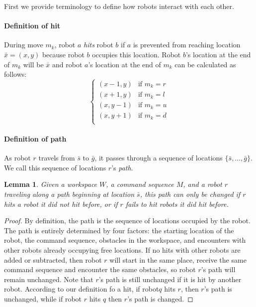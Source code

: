 \documentclass[letterpaper, 10 pt, conference]{ieeeconf}
\newtheorem{lemma}[theorem]{Lemma}
\begin{document}
First we provide terminology to define how robots interact with each other. 


\paragraph{Definition of hit}
During move $m_k$, robot $a$ \emph{hits} robot $b$ if $a$ is prevented from reaching location $\bar{x}=(x,y)$ because robot $b$ occupies this location. Robot $b$'s location at the end of $m_k$ will be $\bar{x}$ and robot $a$'s location at the end of $m_k$ can be calculated as follows:
\begin{displaymath}
    \left\{
     \begin{array}{ll}
       (x-1,y) &\text{if }m_k=r\\
       (x+1,y) &\text{if }m_k=l\\
       (x,y-1) &\text{if }m_k=u\\
       (x,y+1) &\text{if }m_k=d\\
     \end{array}
   \right.
\end{displaymath} 

\paragraph{Definition of path}
As robot $r$ travels from $\bar{s}$ to $\bar{g}$, it passes through a sequence of locations $\{\bar{s},\ldots,\bar{g}\}$.  We call this sequence of locations $r$'s \emph{path}. 

\begin{lemma}\label{lemma:changeInHitsNeededToChangePath}
Given a workspace $W$, a command sequence $M$, and a robot $r$ traveling along a path beginning at location $\bar{s}$, this path can only be changed if $r$ hits a robot it did not hit before, or if $r$ fails to hit robots it did hit before.
\end{lemma}

\begin{proof}
By definition, the path is the sequence of locations occupied by the robot. The path is entirely determined by four factors: the starting location of the robot, the command sequence, obstacles in the workspace,  and encounters with other robots already occupying free locations. If no hits with other robots are added or subtracted, then robot $r$ will start in the same place, receive the same command sequence and encounter the same obstacles, so robot $r$'s path will remain unchanged.  Note that $r$'s path is still unchanged if it is hit by another robot. According to our definition fo a hit, if robot$q$ hits $r$, then $r$'s path is unchanged, while if robot $r$ hits $q$ then $r$'s path is changed. 
\end{proof}
\end{document}
